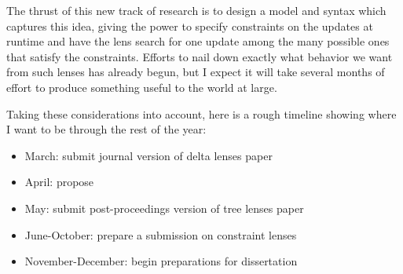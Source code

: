 \documentclass{article}
\begin{document}
The thrust of this new track of research is to design a model and syntax
which captures this idea, giving the power to specify constraints on the
updates at runtime and have the lens search for one update among the many
possible ones that satisfy the constraints. Efforts to nail down exactly
what behavior we want from such lenses has already begun, but I expect it
will take several months of effort to produce something useful to the world
at large.

Taking these considerations into account, here is a rough timeline showing
where I want to be through the rest of the year:
\begin{itemize}
    \item March: submit journal version of delta lenses paper
    \item April: propose
    \item May: submit post-proceedings version of tree lenses paper
    \item June-October: prepare a submission on constraint lenses
    \item November-December: begin preparations for dissertation
\end{itemize}
\end{document}
